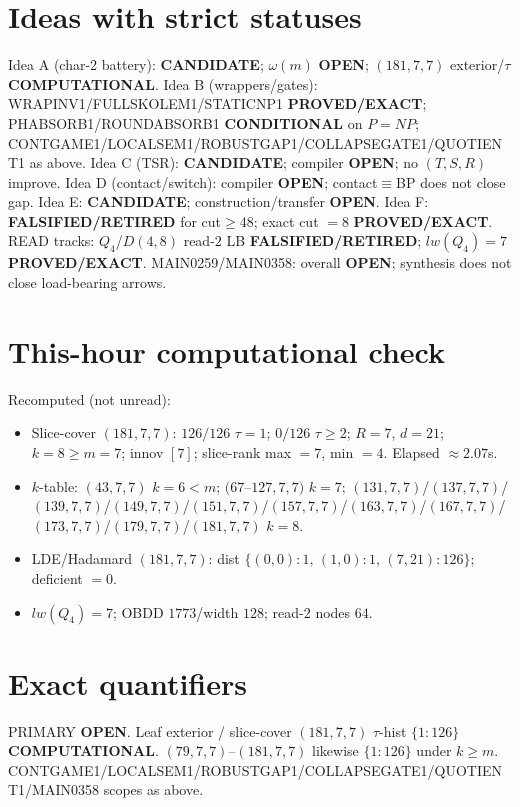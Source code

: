 \documentclass[11pt]{article}
\begin{document}
\section*{Ideas with strict statuses}
Idea A (char-2 battery): \textbf{CANDIDATE}; $\omega(m)$ \textbf{OPEN}; $(181,7,7)$ exterior/$\tau$ \textbf{COMPUTATIONAL}.
Idea B (wrappers/gates): WRAPINV1/FULLSKOLEM1/STATICNP1 \textbf{PROVED/EXACT};
PHABSORB1/ROUNDABSORB1 \textbf{CONDITIONAL} on $P=NP$;
CONTGAME1/LOCALSEM1/ROBUSTGAP1/COLLAPSEGATE1/QUOTIENT1 as above.
Idea C (TSR): \textbf{CANDIDATE}; compiler \textbf{OPEN}; no $(T,S,R)$ improve.
Idea D (contact/switch): compiler \textbf{OPEN}; contact$\equiv$BP does not close gap.
Idea E: \textbf{CANDIDATE}; construction/transfer \textbf{OPEN}.
Idea F: \textbf{FALSIFIED/RETIRED} for cut$\ge48$; exact cut $=8$ \textbf{PROVED/EXACT}.
READ tracks: $Q_4$/$D(4,8)$ read-$2$ LB \textbf{FALSIFIED/RETIRED}; $lw(Q_4)=7$ \textbf{PROVED/EXACT}.
MAIN0259/MAIN0358: overall \textbf{OPEN}; synthesis does not close load-bearing arrows.

\section*{This-hour computational check}
Recomputed (not unread):
\begin{itemize}
\item Slice-cover $(181,7,7)$: $126/126$ $\tau{=}1$; $0/126$ $\tau{\ge}2$; $R{=}7$, $d{=}21$;
  $k{=}8{\ge}m{=}7$; innov $[7]$; slice-rank max $=7$, min $=4$. Elapsed $\approx2.07$s.
\item $k$-table: $(43,7,7)$ $k{=}6{<}m$; $(67$--$127,7,7)$ $k{=}7$;
  $(131,7,7)$/$(137,7,7)$/$(139,7,7)$/$(149,7,7)$/$(151,7,7)$/$(157,7,7)$/$(163,7,7)$/$(167,7,7)$/$(173,7,7)$/$(179,7,7)$/$(181,7,7)$ $k{=}8$.
\item LDE/Hadamard $(181,7,7)$: dist $\{(0,0){:}1,\,(1,0){:}1,\,(7,21){:}126\}$; deficient $=0$.
\item $lw(Q_4)=7$; OBDD $1773$/width $128$; read-$2$ nodes $64$.
\end{itemize}

\section*{Exact quantifiers}
PRIMARY \textbf{OPEN}. Leaf exterior / slice-cover $(181,7,7)$ $\tau$-hist $\{1{:}126\}$ \textbf{COMPUTATIONAL}.
$(79,7,7)$--$(181,7,7)$ likewise $\{1{:}126\}$ under $k{\ge}m$. CONTGAME1/LOCALSEM1/ROBUSTGAP1/COLLAPSEGATE1/QUOTIENT1/MAIN0358 scopes as above.
\end{document}

